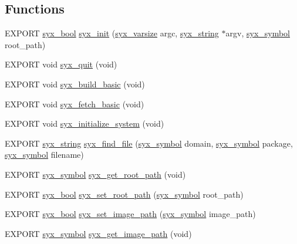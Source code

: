 \subsection*{Functions}
\begin{CompactItemize}
\item 
EXPORT \hyperlink{syx-types_8h_c6dc09b276b99fa1956364359139daab}{syx\_\-bool} \hyperlink{syx-init_8h_8d6c7488dbeffcee4690492bdd2f3a91}{syx\_\-init} (\hyperlink{syx-types_8h_18e1a1417591a1efb670b97ce320f535}{syx\_\-varsize} argc, \hyperlink{syx-types_8h_1bff1fd86072dd98849437bc9dcb35c3}{syx\_\-string} $\ast$argv, \hyperlink{syx-types_8h_9663af54b7b72f5d8be5f754ef356525}{syx\_\-symbol} root\_\-path)
\item 
EXPORT void \hyperlink{syx-init_8h_ce263c15141e6de68d951cfc57d672cb}{syx\_\-quit} (void)
\item 
EXPORT void \hyperlink{syx-init_8h_31c41be993642afd482b099c468212d7}{syx\_\-build\_\-basic} (void)
\item 
EXPORT void \hyperlink{syx-init_8h_c06c3bb03991f52f068cee7e52ff868e}{syx\_\-fetch\_\-basic} (void)
\item 
EXPORT void \hyperlink{syx-init_8h_05223a080e6d39766c81442245d6bf37}{syx\_\-initialize\_\-system} (void)
\item 
EXPORT \hyperlink{syx-types_8h_1bff1fd86072dd98849437bc9dcb35c3}{syx\_\-string} \hyperlink{syx-init_8h_43bb2f31e76b9593fb55491d90da7671}{syx\_\-find\_\-file} (\hyperlink{syx-types_8h_9663af54b7b72f5d8be5f754ef356525}{syx\_\-symbol} domain, \hyperlink{syx-types_8h_9663af54b7b72f5d8be5f754ef356525}{syx\_\-symbol} package, \hyperlink{syx-types_8h_9663af54b7b72f5d8be5f754ef356525}{syx\_\-symbol} filename)
\item 
EXPORT \hyperlink{syx-types_8h_9663af54b7b72f5d8be5f754ef356525}{syx\_\-symbol} \hyperlink{syx-init_8h_c0d78d41f79e4707e3406d10734fc441}{syx\_\-get\_\-root\_\-path} (void)
\item 
EXPORT \hyperlink{syx-types_8h_c6dc09b276b99fa1956364359139daab}{syx\_\-bool} \hyperlink{syx-init_8h_26e334bd4520a346fe829903993f250e}{syx\_\-set\_\-root\_\-path} (\hyperlink{syx-types_8h_9663af54b7b72f5d8be5f754ef356525}{syx\_\-symbol} root\_\-path)
\item 
EXPORT \hyperlink{syx-types_8h_c6dc09b276b99fa1956364359139daab}{syx\_\-bool} \hyperlink{syx-init_8h_e2d4b8ca450daf0766f0ce2e1ce73c54}{syx\_\-set\_\-image\_\-path} (\hyperlink{syx-types_8h_9663af54b7b72f5d8be5f754ef356525}{syx\_\-symbol} image\_\-path)
\item 
EXPORT \hyperlink{syx-types_8h_9663af54b7b72f5d8be5f754ef356525}{syx\_\-symbol} \hyperlink{syx-init_8h_e7f1ad973d8e6155ee3761cac438111f}{syx\_\-get\_\-image\_\-path} (void)
\end{CompactItemize}
